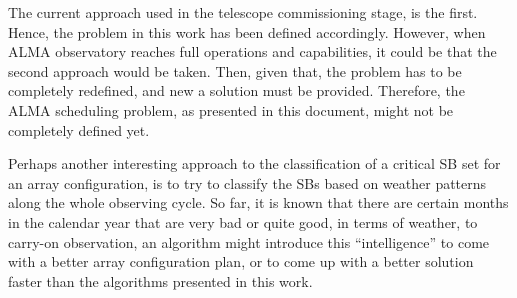 The current approach used in the telescope commissioning stage, is the first. Hence, the problem in this work has been defined accordingly. However, when ALMA observatory reaches full operations and capabilities, it could be that the second approach would be taken. Then, given that, the problem has to be completely redefined, and new a solution must be provided. Therefore, the ALMA scheduling problem, as presented in this document, might not be completely defined yet.

Perhaps another interesting approach to the classification of a critical SB set for an array configuration, is to try to classify the SBs based on weather patterns along the whole observing cycle. So far, it is known that there are certain months in the calendar year that are very bad or quite good, in terms of weather, to carry-on observation, an algorithm might introduce this ``intelligence'' to come with a better array configuration plan, or to come up with a better solution faster than the algorithms presented in this work.